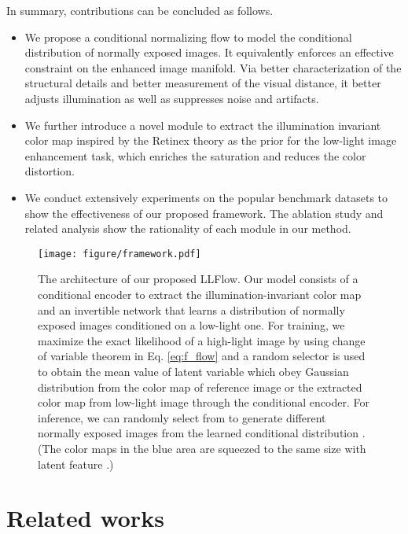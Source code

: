 \documentclass[letterpaper]{article} \usepackage{aaai22}  \usepackage{times}  \usepackage{helvet}  \usepackage{courier}  \usepackage[hyphens]{url}  \usepackage{graphicx} \urlstyle{rm} \def\UrlFont{\rm}  \usepackage{natbib}  \usepackage{caption} \usepackage{subfigure}
\newcommand{\yufei}[1]{{#1}}
\newcommand{\wh}[1]{{#1}}
\begin{document}
In summary, contributions can be concluded as follows.
\begin{itemize}
\item We propose a conditional normalizing flow to model the conditional distribution of normally exposed images. 
It equivalently enforces an effective constraint on the enhanced image manifold. Via better characterization of the structural details and better measurement of the visual distance, it better adjusts illumination as well as suppresses noise and artifacts.
\item 
We further introduce a novel module to extract the illumination invariant color map inspired by the Retinex theory as the prior for the low-light image enhancement task, 
    which enriches the saturation and reduces the color distortion.






    \item 
We conduct extensively experiments on the popular benchmark datasets to show the effectiveness of our proposed framework.
The ablation study and related analysis show the rationality of each module in our method.
\end{itemize}





\begin{figure*}[t]
    \centering
    \texttt{[image: figure/framework.pdf]}
    \caption{The architecture of our proposed LLFlow. Our model consists of a conditional encoder to extract the illumination-invariant color map and an invertible network that learns a distribution of normally exposed images conditioned on a low-light one. For training, we maximize the exact likelihood of a high-light image  by using change of variable theorem in Eq. \wh{\eqref{eq:f_flow}} and a random selector is used to obtain the mean value of latent variable   which obey Gaussian distribution \yufei{from the color map  of reference image or the extracted color map  from low-light image through the conditional encoder}. For inference, we can randomly select  from  to generate \yufei{different normally exposed images}
from the learned conditional distribution .
    (The color maps in the blue area are squeezed to the same size \wh{with} latent feature .)}
    \label{fig:framework}
    \vspace{-0.3cm}
\end{figure*}

\section{Related works}
\end{document}
